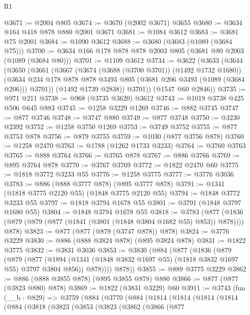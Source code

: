 \begin{lexlean}{R1}
\begin{coremodule}
@3671 := @2004 @805
@3674 := @3670 (@2002 @3671) @3655
@3680 := @3634 @164 @418 @878 @880 @2001 @3671
@3681 := @1084 @3612
@3683 := @3681 @75 @2001
@3684 := @1090 @3612
@3688 := @3680 (@3683 (@1089 (@3684 @75)))
@3700 := @3634 @166 @178 @878 @878 @2003 @805 (@3681 @80 @2003 (@1089 (@3684 @80)))
@3701 := @1109 @3612
@3734 := @3622
    (@3633
      (@3644
        (@3650
          (@3661
            (@3667
              (@3674 (@3688 (@3700 @3701)) (@1492 @1732 @1680))
              (@3634 @234 @178 @878 @878 @3493 @805 (@3681 @206 @3493 (@1089 (@3684 @206))) @3701))
            (@1492 @1739 @2838))
          @3701))
      (@1547 @60 @2846))
@3735 := @971 @211
@3738 := @968 (@3735 @3620) @3612
@3743 := @1019 @3738 @425 @506 @645 @883
@3745 := @1258 @3229 @1269
@3746 := @882 @3745
@3747 := @877 @3746
@3748 := @3747 @880
@3749 := @877 @3748
@3750 := @3230 @2392
@3752 := @1258 @3750 @1269
@3753 := @3749 @3752
@3755 := @877 @3753 @878
@3756 := @879 @3755
@3759 := @1030 (@877 @3756 @878)
@3760 := @1258 @2470
@3763 := @1788 (@1262 @1733 @3233)
@3764 := @3760 @3763
@3765 := @888 @3764
@3766 := @3765 @878
@3767 := @886 @3766
@3769 := @895 @3764 @878
@3770 := @3767 @3769
@3772 := @1822 @2470 @60
@3775 := @1818 @3772 @3233 @55
@3776 := @1258 @3775
@3777 := @3776 @3036
@3783 := @886 (@888 @3777 @878) (@895 @3777 @878)
@3791 := @1341 (@1818 @3775 @2120 @55) (@1848 @3775 @2120 @55)
@3794 := @1848 @3772 @3233 @55
@3797 := @1818 @3794 @1678 @55
@3801 := @3791 (@1848 @3797 @1680 @55)
@3804 := @1848 @3794 @1678 @55
@3818 := @3783
    (@877 (@1836 (@879 (@879 (@877 (@1841 (@3801 (@1848 @3804 @1682 @55) @853)) @878)))) @878)
@3823 := @877 (@877 (@879 (@3747 @878)) @878)
@3824 := @3776 @3229
@3830 := @886 (@888 @3824 @878) (@895 @3824 @878)
@3831 := @1822 @3775
@3832 := @3831 @3036
@3853 := @3830
    (@884
      (@877
        (@1836
          (@879
            (@879
              (@877
                (@1894 (@1341 (@1848 @3832 @1697 @55) (@1818 @3832 @1697 @55) @3797 @3804 @856))
                @878))))
        @878))
@3855 := @889 @3775 @3229
@3862 := @886 (@888 @3855 @878) (@895 @3855 @878) @880
@3866 := @877 (@877 (@3823 @880) @878)
@3869 := @1822 (@3831 @3229) @60
@3911 := @3743
    (fun (__b : @829) =>
    @3759
      (@884
        (@3770
          (@884
            (@1814
              (@1814
                (@1814
                  (@1814
                    (@884
                      (@3818
                        (@3823
                          (@3853
                            (@3823
                              (@3862
                                (@3866
                                  (@877

\end{coremodule}
\end{lexlean}
